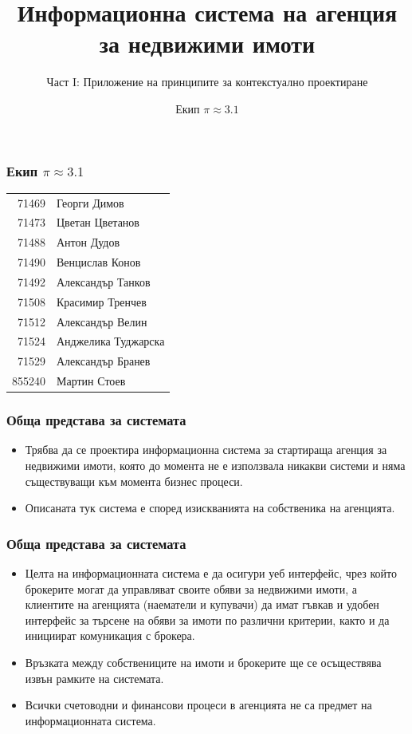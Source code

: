 \documentclass[12pt]{beamer}
\title{Информационна система на агенция за недвижими имоти}
\subtitle{Част I: Приложение на принципите за контекстуално проектиране}
\author{Екип $\pi \approx 3.1$}
\date{}
\begin{document}
\begin{frame}
\titlepage
\end{frame}


\begin{frame}[fragile]
\frametitle{Екип $\pi \approx 3.1$}
\begin{center}

\begin{tabular}{r|l}
71469	& Георги Димов \\ %
71473	& Цветан Цветанов \\ %
71488	& Антон Дудов \\ %
71490	& Венцислав Конов \\ %
71492	& Александър Танков \\ %
71508	& Красимир Тренчев \\ %
71512	& Александър Велин \\ %
71524	& Анджелика Туджарска \\ %
71529	& Александър Бранев \\ %
855240	& Мартин Стоев \\ %
\end{tabular}

\end{center}
\end{frame}

\begin{frame}[fragile]
\frametitle{Обща представа за системата}
	\begin{itemize}
	\item Трябва да се проектира информационна система за стартираща агенция за недвижими имоти, която до момента не е използвала никакви системи и няма съществуващи към момента бизнес процеси. 
	\item Описаната тук система е според изискванията на собственика на агенцията.
	\end{itemize}
\end{frame}

\begin{frame}[fragile]
\frametitle{Обща представа за системата}
	\begin{itemize}
	\item Целта на информационната система е да осигури уеб интерфейс, чрез който брокерите могат да управляват своите обяви за недвижими имоти, а клиентите на агенцията (наематели и купувачи) да имат гъвкав и удобен интерфейс за търсене на обяви за имоти по различни критерии, както и да инициират комуникация с брокера.
	\item Връзката между собствениците на имоти и брокерите ще се осъществява извън рамките на системата.
	\item Всички счетоводни и финансови процеси в агенцията не са предмет на информационната система.
	\end{itemize}
\end{frame}
\end{document}
